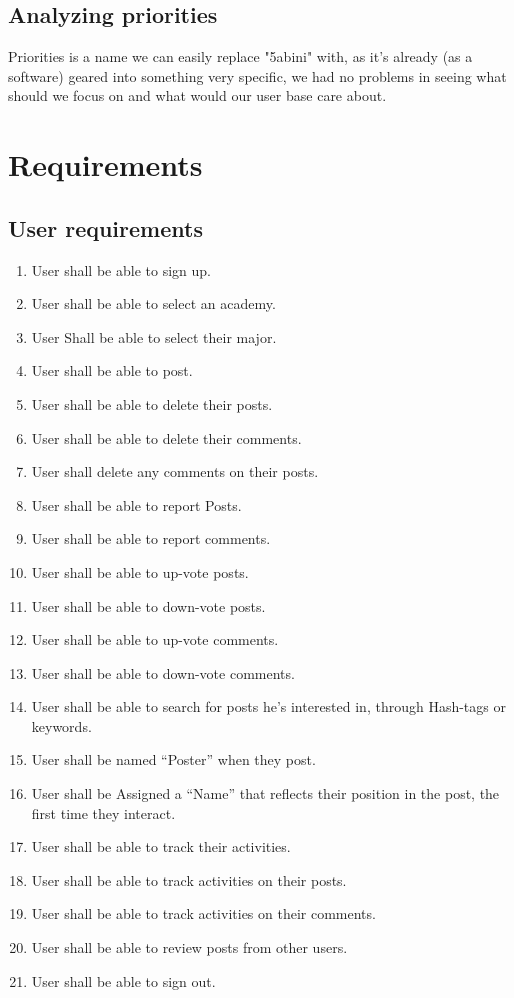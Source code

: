 \documentclass[12pt]{article}
\begin{document}
\subsection{Analyzing priorities}
Priorities is a name we can easily replace "5abini" with, as it's already (as a software) geared into something very specific, we had no problems in seeing what should we focus on and what would our user base care about.
\section{Requirements}
\subsection{User requirements}
\begin{enumerate}
\itemsep0em 
\item User shall be able to sign up.
\item User shall be able to select an academy.
\item User Shall be able to select their major.
\item User shall be able to post.
\item User shall be able to delete their posts.
\item User shall be able to delete their comments.
\item User shall delete any comments on their posts.
\item User shall be able to report Posts.
\item User shall be able to report comments.
\item User shall be able to up-vote posts.
\item User shall be able to down-vote posts.
\item User shall be able to up-vote comments.
\item User shall be able to down-vote comments.
\item User shall be able to search for posts he's interested in, through Hash-tags or keywords.
\item User shall be named “Poster” when they post.
\item User shall be Assigned a “Name” that reflects their position in the post, the first time they interact.
\item User shall be able to track their activities.
\item User shall be able to track activities on their posts.
\item User shall be able to track activities on their comments.
\item User shall be able to review posts from other users.
\item User shall be able to sign out.

\end{enumerate}
\end{document}
